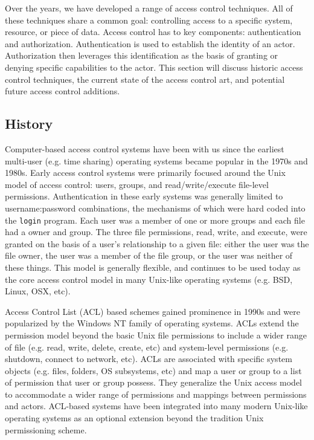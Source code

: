 \documentclass{sig-alternate}
\begin{document}
Over the years, we have developed a range of access control
techniques. All of these techniques share a common goal: controlling
access to a specific system, resource, or piece of data. Access
control has to key components: authentication and
authorization. Authentication is used to establish the identity of an
actor. Authorization then leverages this identification as the basis
of granting or denying specific capabilities to the actor. This
section will discuss historic access control techniques, the current
state of the access control art, and potential future access control
additions.

\subsection{History}

Computer-based access control systems have been with us since the
earliest multi-user (e.g. time sharing) operating systems became
popular in the 1970s and 1980s. Early access control systems were
primarily focused around the Unix model of access control: users,
groups, and read/write/execute file-level permissions. Authentication
in these early systems was generally limited to username:password
combinations, the mechanisms of which were hard coded into the
\texttt{login} program. Each user was a member of one or more groups
and each file had a owner and group. The three file permissions, read,
write, and execute, were granted on the basis of a user's relationship
to a given file: either the user was the file owner, the user was a
member of the file group, or the user was neither of these
things. This model is generally flexible, and continues to be used
today as the core access control model in many Unix-like operating
systems (e.g. BSD, Linux, OSX, etc).

Access Control List (ACL) based schemes gained prominence in 1990s and
were popularized by the Windows NT family of operating systems. ACLs
extend the permission model beyond the basic Unix file permissions to
include a wider range of file (e.g. read, write, delete, create, etc)
and system-level permissions (e.g. shutdown, connect to network,
etc). ACLs are associated with specific system objects (e.g. files,
folders, OS subsystems, etc) and map a user or group to a list of
permission that user or group possess. They generalize the Unix access
model to accommodate a wider range of permissions and mappings between
permissions and actors. ACL-based systems have been integrated into
many modern Unix-like operating systems as an optional extension
beyond the tradition Unix permissioning scheme.
\end{document}

